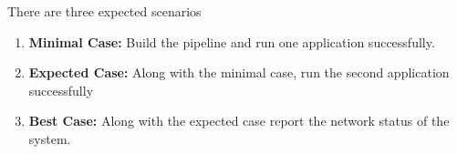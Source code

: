 There are three expected scenarios

\begin{enumerate}
	\item {
		\textbf{Minimal Case:} Build the pipeline and run one application successfully.
	}

	\item {
		\textbf{Expected Case:} Along with the minimal case, run the second application successfully
	}

	\item {
		\textbf{Best Case:} Along with the expected case report the network status of the system.
	}
\end{enumerate}